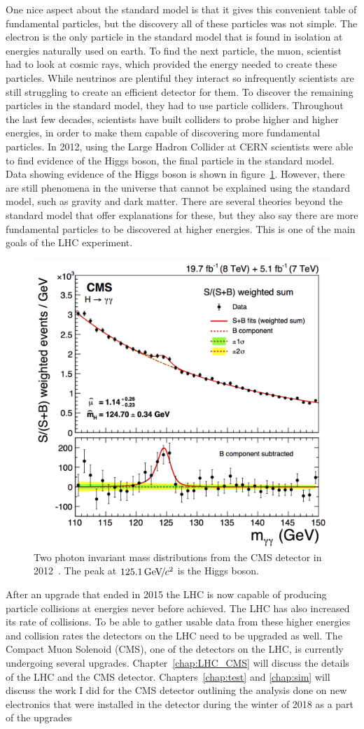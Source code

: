 One nice aspect about the standard model is that it gives this convenient table of fundamental particles, but the discovery all of these particles was not simple. The electron is the only particle in the standard model that is found in isolation at energies naturally used on earth. To find the next particle, the muon, scientist had to look at cosmic rays, which provided the energy needed to create these particles. While neutrinos are plentiful they interact so infrequently scientists are still struggling to create an efficient detector for them. To discover the remaining particles in the standard model, they had to use particle colliders. Throughout the last few decades, scientists have built colliders to probe higher and higher energies, in order to make them capable of discovering more fundamental particles. In 2012, using the Large Hadron Collider at CERN scientists were able to find evidence of the Higgs boson, the final particle in the standard model. Data showing evidence of the Higgs boson is shown in figure~\ref{fig:higgs}. However, there are still phenomena in the universe that cannot be explained using the standard model, such as gravity and dark matter. There are several theories beyond the standard model that offer explanations for these, but they also say there are more fundamental particles to be discovered at higher energies. This is one of the main goals of the LHC experiment. 

\begin{figure}
\centering
\includegraphics[width=0.6\linewidth]{Figures/higgsmeasurement.png}
\caption{Two photon invariant mass distributions from the CMS detector in 2012~\cite{CMS_Higgs_Discovery}. The peak at $125.1{\,\text{Ge\hspace{-.08em}V\hspace{-0.16em}/\hspace{-0.08em}}c^\text{2}}$ is the Higgs boson.}
\label{fig:higgs}
\end{figure} 


After an upgrade that ended in 2015 the LHC is now capable of producing particle collisions at energies never before achieved. The LHC has also increased its rate of collisions. To be able to gather usable data from these higher energies and collision rates the detectors on the LHC need to be upgraded as well. The Compact Muon Solenoid (CMS), one of the detectors on the LHC, is currently undergoing several upgrades. Chapter~\ref{chap:LHC_CMS} will discuss the details of the LHC and the CMS detector. Chapters~\ref{chap:test} and \ref{chap:sim} will discuss the work I did for the CMS detector outlining the analysis done on new electronics that were installed in the detector during the winter of 2018 as a part of the upgrades

